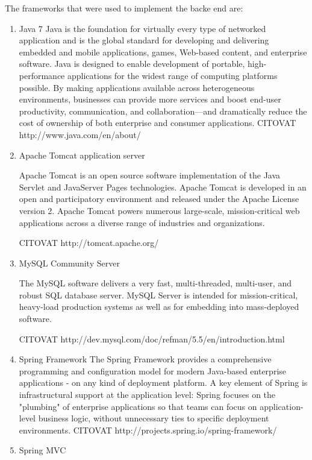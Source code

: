 \documentclass[thesis=B,english]{FITthesis}[2012/10/20]
\begin{document}
The frameworks that were used to implement the backe end are: 
\begin{enumerate}

\item{Java 7}
Java is the foundation for virtually every type of networked application and is the global standard for developing and delivering embedded and mobile applications, games, Web-based content, and enterprise software. Java is designed to enable development of portable, high-performance applications for the widest range of computing platforms possible. By making applications available across heterogeneous environments, businesses can provide more services and boost end-user productivity, communication, and collaboration—and dramatically reduce the cost of ownership of both enterprise and consumer applications. 
CITOVAT http://www.java.com/en/about/

\item{Apache Tomcat application server}

Apache Tomcat is an open source software implementation of the Java Servlet and JavaServer Pages technologies. Apache Tomcat is developed in an open and participatory environment and released under the Apache License version 2. Apache Tomcat powers numerous large-scale, mission-critical web applications across a diverse range of industries and organizations.

CITOVAT http://tomcat.apache.org/

\item{MySQL Community Server}

The MySQL software delivers a very fast, multi-threaded, multi-user, and robust SQL database server. MySQL Server is intended for mission-critical, heavy-load production systems as well as for embedding into mass-deployed software.

CITOVAT http://dev.mysql.com/doc/refman/5.5/en/introduction.html

\item{Spring Framework}
The Spring Framework provides a comprehensive programming and configuration model for modern Java-based enterprise applications - on any kind of deployment platform. A key element of Spring is infrastructural support at the application level: Spring focuses on the "plumbing" of enterprise applications so that teams can focus on application-level business logic, without unnecessary ties to specific deployment environments. 
CITOVAT http://projects.spring.io/spring-framework/ 

\item{Spring MVC}


\end{enumerate}
\end{document}
